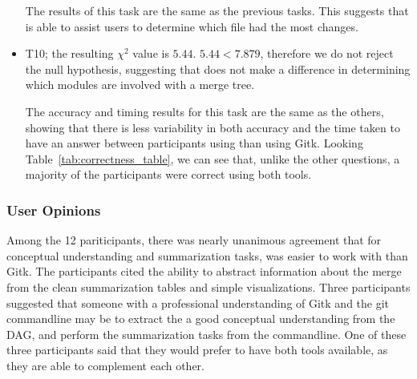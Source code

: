 \begin{itemize}
    The results of this task are the same as the previous tasks.
    This suggests that \tool is able to assist users to determine which
    file had the most changes.

  \item

    T10; the resulting $\chi^2$ value is $5.44$. $5.44 < 7.879$,
    therefore we do not reject the null hypothesis, suggesting that
    \tool does not make a difference in determining which modules are
    involved with a merge tree.

    The accuracy and timing results for this task are the same as the
    others, showing that there is less variability in both accuracy and
    the time taken to have an answer between participants using \tool
    than using Gitk. Looking Table~\ref{tab:correctness_table}, we can
    see that, unlike the other questions, a majority of the participants
    were correct using both tools.

\end{itemize}

\subsubsection{User Opinions}
\label{sub:user_opinions}

Among the 12 pariticipants, there was nearly unanimous agreement that
for conceptual understanding and summarization tasks, \tool was easier
to work with than Gitk. The participants cited the ability to abstract
information about the merge from the clean summarization tables and
simple visualizations. Three participants suggested that someone with a
professional understanding of Gitk and the git commandline may be to
extract the a good conceptual understanding from the DAG, and perform
the summarization tasks from the commandline. One of these three
participants said that they would prefer to have both tools available,
as they are able to complement each other.

